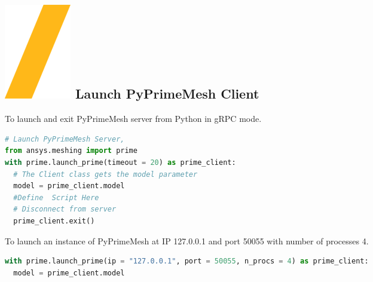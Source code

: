 \documentclass[9pt,landscape]{article}
\begin{document}
\begin{multicols}{3}
\setlength{\premulticols}{1pt}
\setlength{\postmulticols}{1pt}
\setlength{\multicolsep}{1pt}
\setlength{\columnsep}{2pt}

\vfill
\section{\includegraphics[height=\fontcharht\font`\S]{slash.png} Launch PyPrimeMesh Client}
To launch and exit PyPrimeMesh server from Python in gRPC mode.\\
\begin{lstlisting}[language=Python]
# Launch PyPrimeMesh Server, 
from ansys.meshing import prime
with prime.launch_prime(timeout = 20) as prime_client:
  # The Client class gets the model parameter 
  model = prime_client.model
  #Define  Script Here
  # Disconnect from server
  prime_client.exit() 
\end{lstlisting}

To launch an instance of PyPrimeMesh at IP
127.0.0.1 and port 50055 with number of processes 4.
\begin{lstlisting}[language=Python]
 with prime.launch_prime(ip = "127.0.0.1", port = 50055, n_procs = 4) as prime_client:
  model = prime_client.model
\end{lstlisting}


\end{multicols}
\end{document}
